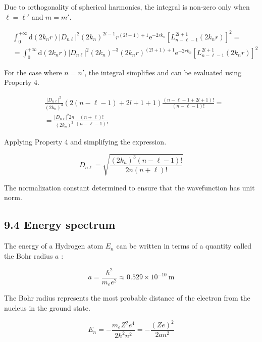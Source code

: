 \documentclass[italian]{HKNdocument}
\begin{document}
Due to orthogonality of spherical harmonics, the integral is non-zero only when $\ell=\ell'$ and $m=m'$.

\begin{align*}
& \int_{0}^{+\infty} \mathrm{d}\left(2 k_{n} r\right)\left|D_{n \ell}\right|^{2}\left(2 k_{n}\right)^{2 l-1} r^{(2 l+1)+1} \mathrm{e}^{-2 r k_{n}}\left[L_{n-\ell-1}^{2 l+1}\left(2 k_{n} r\right)\right]^{2}= \\
& =\int_{0}^{+\infty} \mathrm{d}\left(2 k_{n} r\right)\left|D_{n \ell}\right|^{2}\left(2 k_{n}\right)^{-3}\left(2 k_{n} r\right)^{(2 l+1)+1} \mathrm{e}^{-2 r k_{n}}\left[L_{n-\ell-1}^{2 l+1}\left(2 k_{n} r\right)\right]^{2} \tag{9.82}
\end{align*}

For the case where $n=n'$, the integral simplifies and can be evaluated using Property 4.

\begin{align*}
& \frac{\left|D_{n \ell}\right|^{2}}{\left(2 k_{n}\right)^{3}}(2(n-\ell-1)+2 l+1+1) \frac{(n-\ell-1+2 l+1)!}{(n-\ell-1)!}=  \tag{9.83}\\
& =\frac{\left|D_{n \ell}\right|^{2} 2 n}{\left(2 k_{n}\right)^{3}} \frac{(n+\ell)!}{(n-\ell-1)!}
\end{align*}

Applying Property 4 and simplifying the expression.

\begin{equation*}
D_{n \ell}=\sqrt{\frac{\left(2 k_{n}\right)^{3}(n-\ell-1)!}{2 n(n+\ell)!}} \tag{9.84}
\end{equation*}

The normalization constant determined to ensure that the wavefunction has unit norm.

\subsection*{9.4 Energy spectrum}
The energy of a Hydrogen atom $E_{n}$ can be written in terms of a quantity called the Bohr radius $a$ :

\begin{equation*}
a=\frac{\hbar^{2}}{m_{e} e^{2}} \approx 0.529 \times 10^{-10} \mathrm{~m} \tag{9.85}
\end{equation*}

The Bohr radius represents the most probable distance of the electron from the nucleus in the ground state.

\begin{equation*}
E_{n}=-\frac{m_{e} Z^{2} e^{4}}{2 \hbar^{2} n^{2}}=-\frac{(Z e)^{2}}{2 a n^{2}} \tag{9.86}
\end{equation*}
\end{document}
